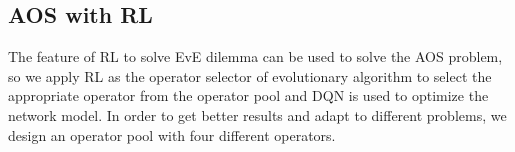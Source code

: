 \documentclass[journal]{IEEEtran}
\begin{document}
\subsection{AOS with RL}
The feature of RL to solve EvE dilemma can be used to solve the AOS problem, so we apply RL as the operator selector of evolutionary algorithm to select the appropriate operator from the operator pool and DQN is used to optimize the network model.
In order to get better results and adapt to different problems, we design an operator pool with four different operators.
\end{document}
